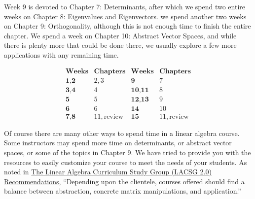 \documentclass{ximera}
\begin{document}
Week 9 is devoted to Chapter 7: Determinants, after which we spend two entire weeks on Chapter 8: Eigenvalues and Eigenvectors.  we spend another two weeks on Chapter 9: Orthogonality, although this is not enough time to finish the entire chapter.  We spend a week on Chapter 10: Abstract Vector Spaces, and while there is plenty more that could be done there, we usually explore a few more applications with any remaining time.


\[
\begin{array}{cc|cc}
\hline
		\textbf{Weeks} & \textbf{Chapters} &  \textbf{Weeks} & \textbf{Chapters} \\ \hline
		\textbf{1,2} & 2,3 &  \textbf{9} &  7 \\
		\textbf{3,4} &  4 &  \textbf{10,11} &  8  \\
		\textbf{5} &  5 &  \textbf{12,13} &  9 \\
		\textbf{6} &  6 &  \textbf{14} &  10\\
		\textbf{7,8} &  11, \text{review} &  \textbf{15} &  11, \text{review}
  
 \end{array}
\]

Of course there are many other ways to spend time in a linear algebra course.  Some instructors may spend more time on determinants, or abstract vector spaces, or some of the topics in Chapter 9.  We have tried to provide you with the resources to easily customize your course to meet the needs of your students.  As noted in \href{https://dx.doi.org/10.1090/noti2479}{The Linear Algebra Curriculum Study Group (LACSG 2.0) Recommendations}, ``Depending upon the clientele, courses offered
should find a balance between abstraction, concrete matrix manipulations, and application.'' 



\end{document}
